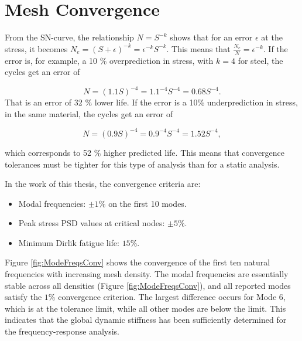 \documentclass[a4paper,twoside]{bth}
\begin{document}




\appendix

\chapter{Mesh Convergence} \label{app:MeshConvergence}

From the SN-curve, the relationship $N=S^{-k}$ shows that for an error $\epsilon$ at the stress, it becomes $N_e=(S+\epsilon)^{-k} = \epsilon^{-k}S^{-k}$. This means that $\tfrac{N_e}{N} = \epsilon^{-k}$. If the error is, for example, a 10 \% overprediction in stress, with $k=4$ for steel, the cycles get an error of

\begin{equation}
    N=(1.1S)^{-4} = 1.1^{-4}S^{-4} = 0.68S^{-4}.
\end{equation}
That is an error of 32 \% lower life. If the error is a 10\% underprediction in stress, in the same material, the cycles get an error of

\begin{equation} \label{eq:underEstimateStress}
    N=(0.9S)^{-4} = 0.9^{-4}S^{-4} = 1.52S^{-4},
\end{equation}

which corresponds to 52 \% higher predicted life. This means that convergence tolerances must be tighter for this type of analysis than for a static analysis.

In the work of this thesis, the convergence criteria are:
\begin{itemize}
    \item Modal frequencies: $\pm 1 \%$ on the first 10 modes.
    \item Peak stress \ac{PSD} values at critical nodes: $\pm 5 \%$.
    \item Minimum Dirlik fatigue life: $15\%$.
\end{itemize}

Figure \ref{fig:ModeFreqsConv} shows the convergence of the first ten natural frequencies with increasing mesh density. The modal frequencies are essentially stable across all densities (Figure \ref{fig:ModeFreqsConv}), and all reported modes satisfy the $1 \%$ convergence criterion. The largest difference occurs for Mode 6, which is at the tolerance limit, while all other modes are below the limit. This indicates that the global dynamic stiffness has been sufficiently determined for the frequency-response analysis. 
\end{document}
